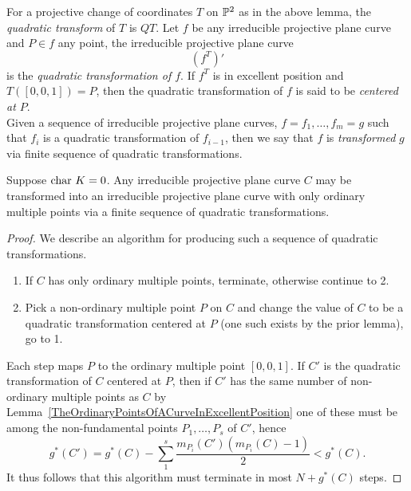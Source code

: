     \begin{definition}
        For a projective change of coordinates $T$ on $\mathbb{P}^2$ as in the above lemma, the \emph{quadratic transform} of $T$ is $QT$. Let $f$ be any irreducible projective plane curve and $P\in f$ any point, the irreducible projective plane curve 
        $$(f^T)'$$
        is the \emph{quadratic transformation of $f$}. If $f^T$ is in excellent position and $T([0,0,1])=P$, then the quadratic transformation of $f$ is said to be \emph{centered at $P$}.\\
        Given a sequence of irreducible projective plane curves, $f=f_1,\dots,f_m=g$ such that $f_i$ is a quadratic transformation of $f_{i-1}$, then we say that $f$ is \emph{transformed} $g$ via finite sequence of quadratic transformations. 
    \end{definition}
    \begin{theorem}\label{HowToTransformCurveWithNonOrdinaryMultiplePointsIntoOneWithOnlyOrdinaryMultiplePoints}
        Suppose $\mathrm{char}\ K =0$. Any irreducible projective plane curve $C$ may be transformed into an irreducible projective plane curve with only ordinary multiple points via a finite sequence of quadratic transformations. 
    \end{theorem}
    \begin{proof}
        We describe an algorithm for producing such a sequence of quadratic transformations. 
        \begin{enumerate}
            \item If $C$ has only ordinary multiple points, terminate, otherwise continue to 2.
            \item Pick a non-ordinary multiple point $P$ on $C$ and change the value of $C$ to be a quadratic transformation centered at $P$ (one such exists by the prior lemma), go to 1.
        \end{enumerate}
        Each step maps $P$ to the ordinary multiple point $[0,0,1]$. If $C'$ is the quadratic transformation of $C$ centered at $P$, then if $C'$ has the same number of non-ordinary multiple points as $C$ by Lemma~\ref{TheOrdinaryPointsOfACurveInExcellentPosition} one of these must be among the non-fundamental points $P_1,\dots,P_s$ of $C'$, hence 
        $$
            g^\ast(C')=g^\ast(C)-\sum_1^s \frac{m_{P_i}(C')(m_{P_i}(C)-1)}{2} < g^\ast(C).
        $$
        It thus follows that this algorithm must terminate in most $N+g^\ast(C)$ steps. 
    \end{proof}

